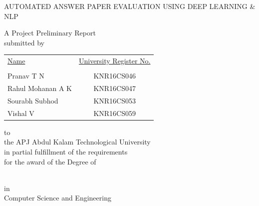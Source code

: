 \newcommand{\jadafont}[1]{{\fontfamily{pzc}\selectfont {\large #1}}}

\begin{titlepage}
\begin{center}
    {\large AUTOMATED ANSWER PAPER EVALUATION USING DEEP LEARNING \& NLP\par}
    \vspace{50px}
	{\LARGE A Project Preliminary Report }\\\medskip
\vspace{20px}
    submitted by\\
    \vspace{30px}
    \begin{table}[!h]
\centering
\begin{tabular}{lc}
\underline{Name} & \underline{University Register No.} \\
\\
Pranav T N & KNR16CS046 \\
Rahul Mohanan A K & KNR16CS047 \\
Sourabh Subhod & KNR16CS053 \\
Vishal V & KNR16CS059 \\
\end{tabular}
\end{table}
\vspace{20px}
to\\
\vspace{20px}
{\sc the APJ Abdul Kalam Technological University\\
\vspace{10px}
in partial fulfillment of the requirements \\
\vspace{10px}
for the award of the Degree of}\\
\vspace{10px}
{\jadafont{Bachelor of Technology}\\\medskip
	{\sc in \\ Computer Science and Engineering} 

}
\end{center}
\end{titlepage}
